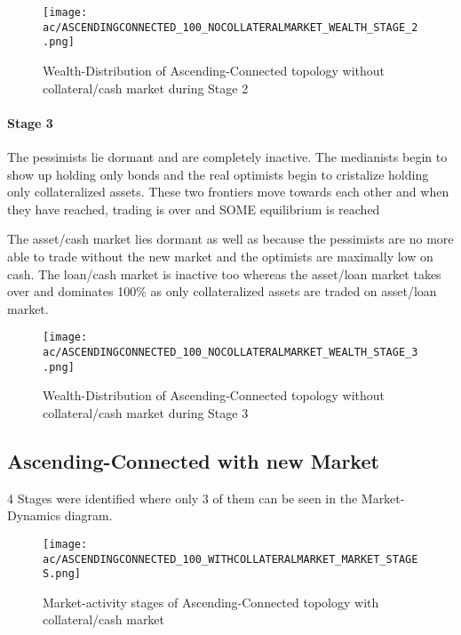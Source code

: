 \documentclass[Bachelorarbeit.tex]{subfiles}
\begin{document}
\begin{figure}[H]
	\centering
  \texttt{[image: ac/ASCENDINGCONNECTED\_100\_NOCOLLATERALMARKET\_WEALTH\_STAGE\_2.png]}
  	\caption{Wealth-Distribution of Ascending-Connected topology without collateral/cash market during Stage 2}
	\label{fig:markets_ASCENDINGCONNECTED_100_NOCOLLATERALMARKET_WEALTH_STAGE_2}
\end{figure}
		
\paragraph{Stage 3}
The pessimists lie dormant and are completely inactive. The medianists begin to show up holding only bonds and the real optimists begin to cristalize holding only collateralized assets. These two frontiers move towards each other and when they have reached, trading is over and SOME equilibrium is reached

\medskip

The asset/cash market lies dormant as well as because the pessimists are no more able to trade without the new market and the optimists are maximally low on cash. The loan/cash market is inactive too whereas the asset/loan market takes over and dominates 100\% as only collateralized assets are traded on asset/loan market.

\begin{figure}[H]
	\centering
  \texttt{[image: ac/ASCENDINGCONNECTED\_100\_NOCOLLATERALMARKET\_WEALTH\_STAGE\_3.png]}
  	\caption{Wealth-Distribution of Ascending-Connected topology without collateral/cash market during Stage 3}
	\label{fig:markets_ASCENDINGCONNECTED_100_NOCOLLATERALMARKET_WEALTH_STAGE_3}
\end{figure}


\subsection{Ascending-Connected with new Market}

4 Stages were identified where only 3 of them can be seen in the Market-Dynamics diagram.

\begin{figure}[H]
	\centering
  \texttt{[image: ac/ASCENDINGCONNECTED\_100\_WITHCOLLATERALMARKET\_MARKET\_STAGES.png]}
  	\caption{Market-activity stages of Ascending-Connected topology with collateral/cash market}
	\label{fig:markets_ASCENDINGCONNECTED_100_WITHCOLLATERALMARKET_MARKET_STAGES}
\end{figure}
\end{document}
